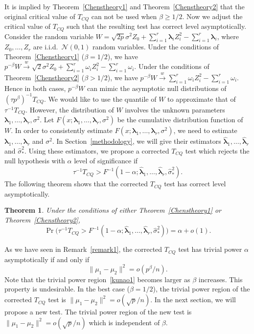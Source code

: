 \documentclass[times,sort&compress,3p]{elsarticle}
\newcommand{\bfsym}[1]{\ensuremath{\boldsymbol{#1}}}
\def\blambda {\bfsym {\lambda}}        \def\bLambda {\bfsym {\Lambda}}
\theoremstyle{plain}
\newtheorem{theorem}{\quad\quad Theorem}
\theoremstyle{definition}
\theoremstyle{remark}
\begin{document}
It is implied by Theorem~\ref{Chenstheory1} and Theorem~\ref{Chenstheory2} that the original critical value of $T_{CQ}$ can not be used when $\beta\geq 1/2$.
Now we adjust the critical value of $T_{CQ}$ such that the resulting test has correct level asymptotically.
Consider the random variable
$
W=
\sqrt{2p}\sigma^2 Z_0
+
        \sum_{i=1}^r \blambda_i Z_i^2
            -
        \sum_{i=1}^r \blambda_i
        $, 
where $Z_0,\ldots,Z_r$ are i.i.d.\ $\mathcal{N}(0,1)$ random variables.
Under the conditions of Theorem~\ref{Chenstheory1} ($\beta=1/2$), we have
$
  p^{-\beta}W\xrightarrow{w}
\sqrt{2}\sigma^2 Z_0 + \sum_{i=1}^r \omega_i Z_i^2 -\sum_{i=1}^r \omega_i
$.
Under the conditions of Theorem~\ref{Chenstheory2} ($\beta>1/2$), we have
$
 p^{-\beta}W\xrightarrow{w}
\sum_{i=1}^r \omega_i Z_i^2 -\sum_{i=1}^r \omega_i.
$
Hence in both cases, $p^{-\beta}W$ can mimic the asymptotic null distributions of $(\tau p^{\beta})^{-1}T_{CQ}$.
We would like to use the quantile of $W$ to approximate that of $\tau^{-1}T_{CQ}$.
        However, the distribution of $W$ involves the unknown parameters $\blambda_1,\ldots,\blambda_r,\sigma^2$.
Let $F(x;\blambda_1,\ldots,\blambda_r,\sigma^2)$ be the cumulative distribution function of $W$.
In order to consistently estimate $F(x;\blambda_1,\ldots,\blambda_r,\sigma^2)$, we need to estimate $\blambda_1,\ldots,\blambda_r$ and $\sigma^2$.
In Section~\ref{methodology}, we will give their estimators $\hat{\blambda}_1,\ldots,\hat{\blambda}_r$ and $\hat{\sigma}_{*}^2$. 
Using these estimators, we propose a corrected $T_{CQ}$ test which rejects the null hypothesis with $\alpha$ level of significance if
$$
\tau^{-1}{T_{CQ}}> F^{-1}(1-\alpha;\hat{\blambda}_1,\ldots,\hat{\blambda}_r,\hat{\sigma}_*^2).
$$
The following theorem shows that the corrected $T_{CQ}$ test has correct level asymptotically.

\begin{theorem}\label{theoremRev}
Under the conditions of either Theorem~\ref{Chenstheory1} or Theorem~\ref{Chenstheory2},
$$
    \Pr\big(\tau^{-1}{T_{CQ}}> F^{-1}(1-\alpha;\hat{\blambda}_1,\ldots,\hat{\blambda}_r,\hat{\sigma}_*^2)\big)=\alpha+o(1).
$$
\end{theorem}





As we have seen in Remark~\ref{remark1}, the corrected $T_{CQ}$ test has trivial power $\alpha$ asymptotically if and only if
\begin{equation}\label{kunao1}
\|\mu_1-\mu_2\|^2 = o( p^{\beta}/n).
\end{equation}
Note that the trivial power region~\eqref{kunao1} becomes larger as $\beta$ increases.
This property is undesirable.
In the best case ($\beta=1/2$), the trivial power region of the corrected $T_{CQ}$ test is $\|\mu_1-\mu_2\|^2=o(\sqrt{p}/n)$.
In the next section, we will propose a new test. The trivial power region of the new test is $\|\mu_1-\mu_2\|^2=o(\sqrt{p}/n)$ which is independent of $\beta$.
\end{document}
